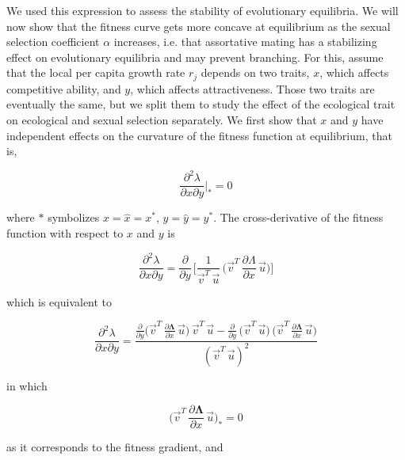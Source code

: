 We used this expression to assess the stability of evolutionary equilibria. We will now show that the fitness curve gets more concave at equilibrium as the sexual selection coefficient $\alpha$ increases, i.e. that assortative mating has a stabilizing effect on evolutionary equilibria and may prevent branching. For this, assume that the local per capita growth rate $r_j$ depends on two traits, $x$, which affects competitive ability, and $y$, which affects attractiveness. Those two traits are eventually the same, but we split them to study the effect of the ecological trait on ecological and sexual selection separately. We first show that $x$ and $y$ have independent effects on the curvature of the fitness function at equilibrium, that is,

\begin{equation}
    \frac{\partial^2 \lambda}{\partial x \partial y}\bigg|_* = 0
\end{equation}

where $*$ symbolizes $x=\hat x=x^*$, $y=\hat y=y^*$. The cross-derivative of the fitness function with respect to $x$ and $y$ is

\begin{equation}
    \frac{\partial^2 \lambda}{\partial x \partial y} = \frac{\partial}{\partial y}\,\Bigg[\frac{1}{\overrightarrow{v}^T\,\overrightarrow{u}}\,\bigg( \overrightarrow{v}^T\,\frac{\partial \Lambda}{\partial x}\,\overrightarrow{u} \bigg)\Bigg]
\end{equation}

which is equivalent to

\begin{equation}
    \frac{\partial^2 \lambda}{\partial x \partial y} = \frac{\frac{\partial}{\partial y}\Big(\overrightarrow{v}^T\,\frac{\partial \pmb \Lambda}{\partial x}\,\overrightarrow{u}\Big)\,\overrightarrow{v}^T\,\overrightarrow{u}-\frac{\partial}{\partial y}\,\Big(\overrightarrow{v}^T\,\overrightarrow{u}\Big)\,\Big(\overrightarrow{v}^T\,\frac{\partial \pmb \Lambda}{\partial x}\,\overrightarrow{u}\Big)}{(\overrightarrow{v}^T\,\overrightarrow{u})^2}
\end{equation}

in which

\begin{equation}
    \bigg(\overrightarrow{v}^T\,\frac{\partial \pmb \Lambda}{\partial x}\,\overrightarrow{u}\bigg)_* = 0
\end{equation}

as it corresponds to the fitness gradient, and

